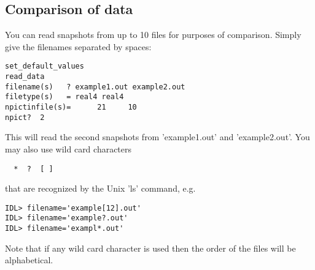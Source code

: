 \documentclass{article}
\begin{document}
\subsection{Comparison of data \label{s-compare}}

   You can read snapshots from up to 10 files for purposes of
   comparison. Simply give the filenames separated by spaces:
\begin{verbatim}
set_default_values
read_data
filename(s)   ? example1.out example2.out
filetype(s)   = real4 real4
npictinfile(s)=      21     10
npict?  2
\end{verbatim}
   This will read the second snapshots from 'example1.out' and
   'example2.out'. You may also use wild card characters 
\begin{verbatim}
  *  ?  [ ]
\end{verbatim}
    that are recognized by the Unix 'ls' command, e.g.
\begin{verbatim}
IDL> filename='example[12].out'
IDL> filename='example?.out'
IDL> filename='exampl*.out'
\end{verbatim}
   Note that if any wild card character is used then the order of the files will 
   be alphabetical.
\end{document}
